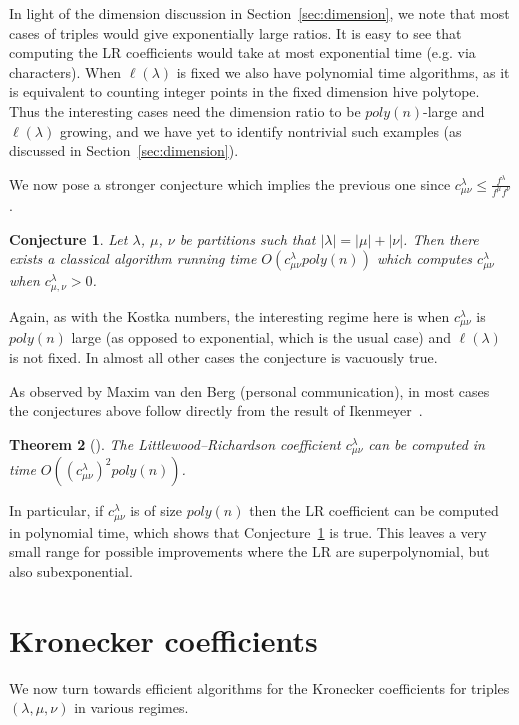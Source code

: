 \documentclass[11pt]{amsart}
\newtheorem{thm}{Theorem}[section]
\newtheorem{conj}[thm]{Conjecture}
\theoremstyle{plain}
\theoremstyle{definition}
\numberwithin{equation}{section}
\newcommand{\la}{\lambda}
\newcommand{\poly}{poly}
\def\la{\lambda}
\begin{document}
In light of the dimension discussion in Section~\ref{sec:dimension}, we note that most cases of triples would give exponentially large ratios. It is easy to see that computing the LR coefficients would take at most exponential time (e.g. via characters). When $\ell(\la)$ is fixed we also have polynomial time algorithms, as it is equivalent to counting integer points in the fixed dimension hive polytope. Thus the interesting cases need the dimension ratio to be $\poly(n)$-large and $\ell(\lambda)$ growing, and we have yet to identify nontrivial such examples (as discussed in Section~\ref{sec:dimension}).


We now  pose a stronger conjecture which implies the previous one since $c^\la_{\mu\nu} \leq \frac{f^\la}{f^\mu f^\nu}$. 
\begin{conj}\label{conj:lr2}
Let $\la$, $\mu$, $\nu$ be partitions such that $|\la|=|\mu|+|\nu|$. Then there exists a classical algorithm running time $O(c^\la_{\mu\nu} \poly(n))$ which computes $c^\la_{\mu\nu}$ when $c^\la_{\mu,\nu}>0$.
\end{conj}

Again, as with the Kostka numbers, the interesting regime here is when $c^\la_{\mu\nu}$ is $\poly(n)$ large (as opposed to exponential, which is the usual case) and $\ell(\la)$ is not fixed. In almost all other cases the conjecture is vacuously true. 

As observed by Maxim van den Berg (personal communication), in most cases the conjectures above follow directly from the result of Ikenmeyer~\cite{ikenmeyer2016small}.

\begin{thm}[\cite{ikenmeyer2016small}]
The Littlewood--Richardson coefficient $c^\la_{\mu\nu}$ can be computed in time $O((c^\la_{\mu\nu})^2 \poly(n))$.
\end{thm}

In particular, if $c^\la_{\mu\nu}$ is of size $\poly(n)$ then the LR coefficient can be computed in polynomial time, which shows that Conjecture~\ref{conj:lr2} is true. This leaves a very small range for possible improvements where the LR are superpolynomial, but also subexponential. 


\section{Kronecker coefficients}\label{sec:kron}

We now turn towards efficient algorithms for the Kronecker coefficients for triples $(\la,\mu,\nu)$ in various regimes.
\end{document}
